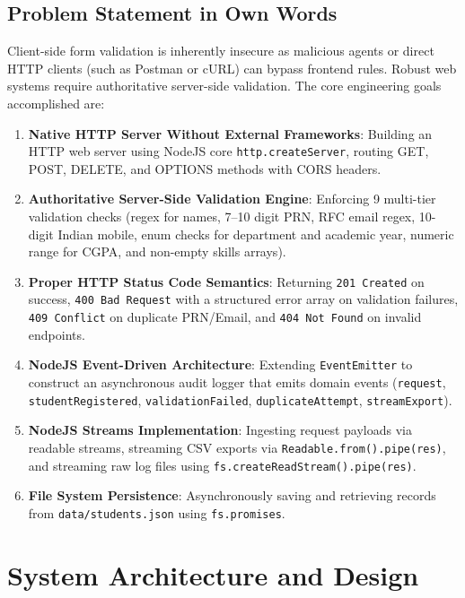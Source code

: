 \documentclass[11pt,a4paper]{article}
\begin{document}
\subsection{Problem Statement in Own Words}
Client-side form validation is inherently insecure as malicious agents or direct HTTP clients (such as Postman or cURL) can bypass frontend rules. Robust web systems require authoritative server-side validation. The core engineering goals accomplished are:
\begin{enumerate}
    \item \textbf{Native HTTP Server Without External Frameworks}: Building an HTTP web server using NodeJS core \texttt{http.createServer}, routing GET, POST, DELETE, and OPTIONS methods with CORS headers.
    \item \textbf{Authoritative Server-Side Validation Engine}: Enforcing 9 multi-tier validation checks (regex for names, 7--10 digit PRN, RFC email regex, 10-digit Indian mobile, enum checks for department and academic year, numeric range for CGPA, and non-empty skills arrays).
    \item \textbf{Proper HTTP Status Code Semantics}: Returning \texttt{201 Created} on success, \texttt{400 Bad Request} with a structured error array on validation failures, \texttt{409 Conflict} on duplicate PRN/Email, and \texttt{404 Not Found} on invalid endpoints.
    \item \textbf{NodeJS Event-Driven Architecture}: Extending \texttt{EventEmitter} to construct an asynchronous audit logger that emits domain events (\texttt{request}, \texttt{studentRegistered}, \texttt{validationFailed}, \texttt{duplicateAttempt}, \texttt{streamExport}).
    \item \textbf{NodeJS Streams Implementation}: Ingesting request payloads via readable streams, streaming CSV exports via \texttt{Readable.from().pipe(res)}, and streaming raw log files using \texttt{fs.createReadStream().pipe(res)}.
    \item \textbf{File System Persistence}: Asynchronously saving and retrieving records from \texttt{data/students.json} using \texttt{fs.promises}.
\end{enumerate}

\section{System Architecture and Design}
\end{document}
